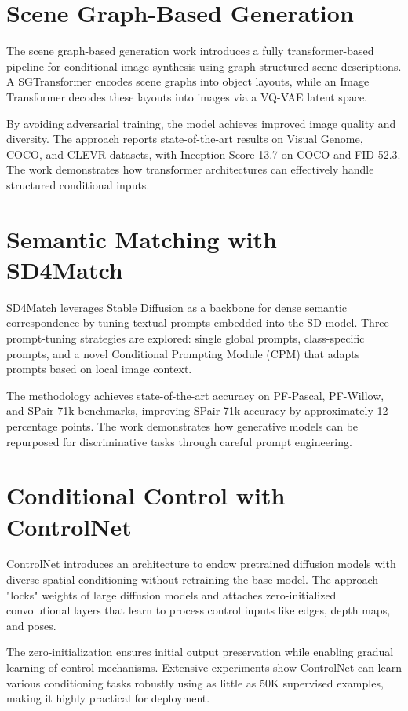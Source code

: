 \documentclass[a4paper]{article}
\begin{document}
\section{Scene Graph-Based Generation}

The scene graph-based generation work introduces a fully transformer-based pipeline for conditional image synthesis using graph-structured scene descriptions. A SGTransformer encodes scene graphs into object layouts, while an Image Transformer decodes these layouts into images via a VQ-VAE latent space.

By avoiding adversarial training, the model achieves improved image quality and diversity. The approach reports state-of-the-art results on Visual Genome, COCO, and CLEVR datasets, with Inception Score 13.7 on COCO and FID 52.3. The work demonstrates how transformer architectures can effectively handle structured conditional inputs.

\section{Semantic Matching with SD4Match}

SD4Match leverages Stable Diffusion as a backbone for dense semantic correspondence by tuning textual prompts embedded into the SD model. Three prompt-tuning strategies are explored: single global prompts, class-specific prompts, and a novel Conditional Prompting Module (CPM) that adapts prompts based on local image context.

The methodology achieves state-of-the-art accuracy on PF-Pascal, PF-Willow, and SPair-71k benchmarks, improving SPair-71k accuracy by approximately 12 percentage points. The work demonstrates how generative models can be repurposed for discriminative tasks through careful prompt engineering.

\section{Conditional Control with ControlNet}

ControlNet introduces an architecture to endow pretrained diffusion models with diverse spatial conditioning without retraining the base model. The approach "locks" weights of large diffusion models and attaches zero-initialized convolutional layers that learn to process control inputs like edges, depth maps, and poses.

The zero-initialization ensures initial output preservation while enabling gradual learning of control mechanisms. Extensive experiments show ControlNet can learn various conditioning tasks robustly using as little as 50K supervised examples, making it highly practical for deployment.
\end{document}
